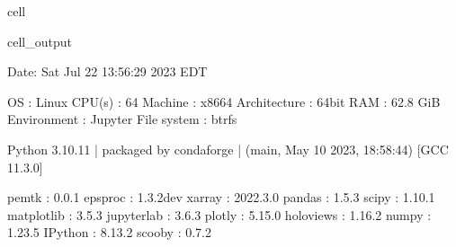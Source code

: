 \documentclass[letterpaper,table,10pt,english]{jupyterBook}
\begin{document}
\begin{sphinxuseclass}{cell}
\begin{sphinxVerbatimOutput}
\begin{sphinxuseclass}{cell_output}
\begin{sphinxVerbatim}[commandchars=\\\{\}]
\PYGZhy{}\PYGZhy{}\PYGZhy{}\PYGZhy{}\PYGZhy{}\PYGZhy{}\PYGZhy{}\PYGZhy{}\PYGZhy{}\PYGZhy{}\PYGZhy{}\PYGZhy{}\PYGZhy{}\PYGZhy{}\PYGZhy{}\PYGZhy{}\PYGZhy{}\PYGZhy{}\PYGZhy{}\PYGZhy{}\PYGZhy{}\PYGZhy{}\PYGZhy{}\PYGZhy{}\PYGZhy{}\PYGZhy{}\PYGZhy{}\PYGZhy{}\PYGZhy{}\PYGZhy{}\PYGZhy{}\PYGZhy{}\PYGZhy{}\PYGZhy{}\PYGZhy{}\PYGZhy{}\PYGZhy{}\PYGZhy{}\PYGZhy{}\PYGZhy{}\PYGZhy{}\PYGZhy{}\PYGZhy{}\PYGZhy{}\PYGZhy{}\PYGZhy{}\PYGZhy{}\PYGZhy{}\PYGZhy{}\PYGZhy{}\PYGZhy{}\PYGZhy{}\PYGZhy{}\PYGZhy{}\PYGZhy{}\PYGZhy{}\PYGZhy{}\PYGZhy{}\PYGZhy{}\PYGZhy{}\PYGZhy{}\PYGZhy{}\PYGZhy{}\PYGZhy{}\PYGZhy{}\PYGZhy{}\PYGZhy{}\PYGZhy{}\PYGZhy{}\PYGZhy{}\PYGZhy{}\PYGZhy{}\PYGZhy{}\PYGZhy{}\PYGZhy{}\PYGZhy{}\PYGZhy{}\PYGZhy{}\PYGZhy{}\PYGZhy{}
  Date: Sat Jul 22 13:56:29 2023 EDT

                OS : Linux
            CPU(s) : 64
           Machine : x86\PYGZus{}64
      Architecture : 64bit
               RAM : 62.8 GiB
       Environment : Jupyter
       File system : btrfs

  Python 3.10.11 | packaged by conda\PYGZhy{}forge | (main, May 10 2023, 18:58:44)
  [GCC 11.3.0]

             pemtk : 0.0.1
           epsproc : 1.3.2\PYGZhy{}dev
            xarray : 2022.3.0
            pandas : 1.5.3
             scipy : 1.10.1
        matplotlib : 3.5.3
        jupyterlab : 3.6.3
            plotly : 5.15.0
         holoviews : 1.16.2
             numpy : 1.23.5
           IPython : 8.13.2
            scooby : 0.7.2
\PYGZhy{}\PYGZhy{}\PYGZhy{}\PYGZhy{}\PYGZhy{}\PYGZhy{}\PYGZhy{}\PYGZhy{}\PYGZhy{}\PYGZhy{}\PYGZhy{}\PYGZhy{}\PYGZhy{}\PYGZhy{}\PYGZhy{}\PYGZhy{}\PYGZhy{}\PYGZhy{}\PYGZhy{}\PYGZhy{}\PYGZhy{}\PYGZhy{}\PYGZhy{}\PYGZhy{}\PYGZhy{}\PYGZhy{}\PYGZhy{}\PYGZhy{}\PYGZhy{}\PYGZhy{}\PYGZhy{}\PYGZhy{}\PYGZhy{}\PYGZhy{}\PYGZhy{}\PYGZhy{}\PYGZhy{}\PYGZhy{}\PYGZhy{}\PYGZhy{}\PYGZhy{}\PYGZhy{}\PYGZhy{}\PYGZhy{}\PYGZhy{}\PYGZhy{}\PYGZhy{}\PYGZhy{}\PYGZhy{}\PYGZhy{}\PYGZhy{}\PYGZhy{}\PYGZhy{}\PYGZhy{}\PYGZhy{}\PYGZhy{}\PYGZhy{}\PYGZhy{}\PYGZhy{}\PYGZhy{}\PYGZhy{}\PYGZhy{}\PYGZhy{}\PYGZhy{}\PYGZhy{}\PYGZhy{}\PYGZhy{}\PYGZhy{}\PYGZhy{}\PYGZhy{}\PYGZhy{}\PYGZhy{}\PYGZhy{}\PYGZhy{}\PYGZhy{}\PYGZhy{}\PYGZhy{}\PYGZhy{}\PYGZhy{}\PYGZhy{}
\end{sphinxVerbatim}

\end{sphinxuseclass}\end{sphinxVerbatimOutput}

\end{sphinxuseclass}
\end{document}
